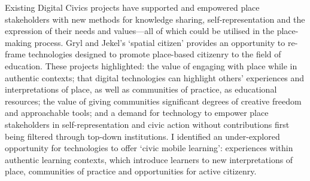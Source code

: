 Existing Digital Civics projects have supported and empowered place stakeholders with new methods for knowledge sharing, self-representation and the expression of their needs and values---all of which could be utilised in the place-making process. Gryl and Jekel's `spatial citizen' provides an opportunity to re-frame technologies designed to promote place-based citizenry to the field of education. These projects highlighted: the value of engaging with place while in authentic contexts; that digital technologies can highlight others’ experiences and interpretations of place, as well as communities of practice, as educational resources; the value of giving communities significant degrees of creative freedom and approachable tools; and a demand for technology to empower place stakeholders in self-representation and civic action without contributions first being filtered through top-down institutions. I identified an under-explored opportunity for technologies to offer `civic mobile learning': experiences within authentic learning contexts, which introduce learners to new interpretations of place, communities of practice and opportunities for active citizenry.